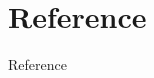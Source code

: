 \documentclass[aspectratio=169,dvipdfmx,cjk,handout,hyperref,8pt]{beamer} %
\newtheorem{thm}{Theorem}[section]
\theoremstyle{example}
\begin{document}
\section{Reference}
\begin{frame}[allowframebreaks]{Reference}
    \beamertemplatetextbibitems
    
    
\end{frame}




\end{document}
